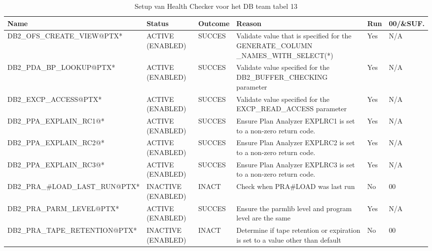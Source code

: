 \begin{landscape}
	\begin{table}[h]
		\begin{tabular}{|l|p{2.3cm}|l|p{4.5cm}|l|l|}
			\hline
			\textbf{Name}                       & \textbf{Status}   & \textbf{Outcome} & \textbf{Reason}    & \textbf{Run} &	\textbf{00/\&SUF.} \\ \hline
			DB2\_OFS\_CREATE\_VIEW@PTX*      & ACTIVE (ENABLED)   & SUCCES & Validate   value that is specified for the GENERATE\_COLUMN \_NAMES\_WITH\_SELECT(*) & Yes & N/A \\ \hline
			DB2\_PDA\_BP\_LOOKUP@PTX*        & ACTIVE (ENABLED)   & SUCCES & Validate   value specified for the DB2\_BUFFER\_CHECKING parameter                          & Yes & N/A \\ \hline
			DB2\_EXCP\_ACCESS@PTX*           & ACTIVE (ENABLED)   & SUCCES & Validate   value specified for the EXCP\_READ\_ACCESS parameter                             & Yes & N/A \\ \hline
			DB2\_PPA\_EXPLAIN\_RC1@*         & ACTIVE (ENABLED)   & SUCCES & Ensure   Plan Analyzer EXPLRC1 is set to a non-zero return code.                            & Yes & N/A \\ \hline
			DB2\_PPA\_EXPLAIN\_RC2@*         & ACTIVE (ENABLED)   & SUCCES & Ensure   Plan Analyzer EXPLRC2 is set to a non-zero return code.                            & Yes & N/A \\ \hline
			DB2\_PPA\_EXPLAIN\_RC3@*         & ACTIVE (ENABLED)   & SUCCES & Ensure   Plan Analyzer EXPLRC3 is set to a non-zero return code.                            & Yes & N/A \\ \hline
			DB2\_PRA\_\#LOAD\_LAST\_RUN@PTX* & INACTIVE (ENABLED) & INACT  & Check   when PRA\#LOAD was last run                                                         & No  & 00  \\ \hline
			DB2\_PRA\_PARM\_LEVEL@PTX*       & ACTIVE (ENABLED)   & SUCCES & Ensure   the parmlib level and program level are the same                                   & Yes & N/A \\ \hline
			DB2\_PRA\_TAPE\_RETENTION@PTX*   & INACTIVE (ENABLED) & INACT  & Determine   if tape retention or expiration is set to a value other than default            & No  & 00  \\ \hline
		\end{tabular}
		\caption[Health Checker DB team tabel 1]{Setup van Health Checker voor het DB team tabel 13}
		\label{tbl:DB Team Tabel 1}
	\end{table}
\end{landscape}

